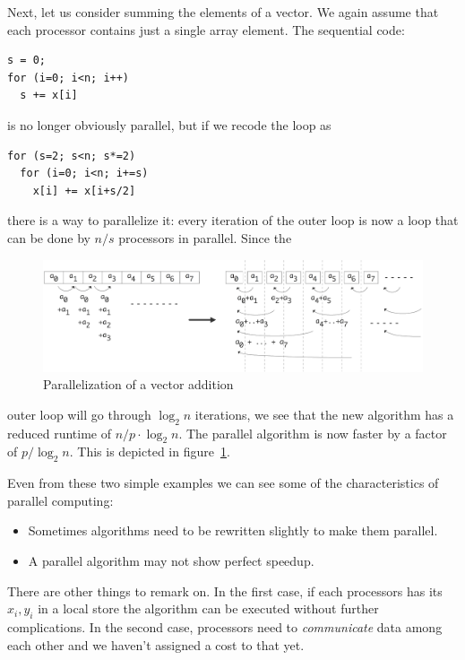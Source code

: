 Next, let us consider summing the elements of a vector. We again
assume that each processor contains just a single array element. The
sequential code:
\begin{verbatim}
s = 0;
for (i=0; i<n; i++)
  s += x[i]
\end{verbatim}
is no longer obviously parallel, but if we recode the loop as
\begin{verbatim}
for (s=2; s<n; s*=2)
  for (i=0; i<n; i+=s)
    x[i] += x[i+s/2]
\end{verbatim}
there is a way to parallelize it: every iteration of the outer loop is
now a loop that can be done by $n/s$ processors in parallel. Since the
\begin{figure}[ht]
  \includegraphics[scale=.13]{graphics-public/parallel-sum}
  \caption{Parallelization of a vector addition}
  \label{fig:par-sum}
\end{figure}
outer loop will go through $\log_2n$ iterations, we see that the new
algorithm has a reduced runtime of $n/p\cdot\log_2 n$. The parallel
algorithm is now faster by a factor of $p/\log_2n$. This is depicted
in figure~\ref{fig:par-sum}.

Even from these two simple examples we can see some of the
characteristics of parallel computing:
\begin{itemize}
\item Sometimes algorithms need to be rewritten slightly to make them
  parallel.
\item A parallel algorithm may not show perfect speedup.
\end{itemize}
There are other things to remark on. In the first case, if each
processors has its $x_i,y_i$ in a local store the
algorithm can be executed without further complications. In the second
case, processors need to \emph{communicate} data among each
other and we haven't assigned a cost to that yet.

